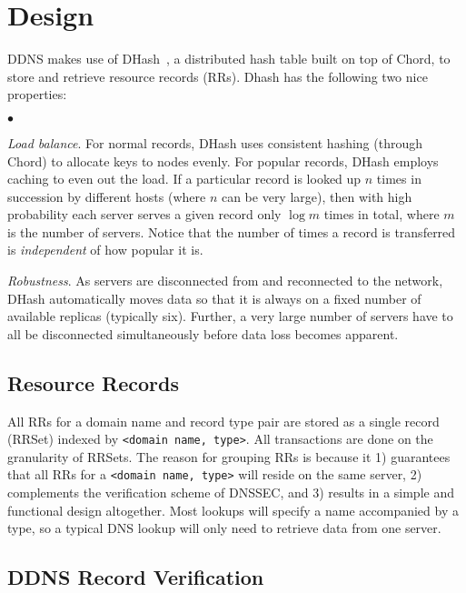 \section{Design}

DDNS makes use of
DHash~\cite{cfs:sosp01}, a distributed hash table
built on top of Chord, to store
and retrieve resource records (RRs).
Dhash has the following two nice properties:

\begin{list}{$\bullet$}{}
\item {\em Load balance}.
For normal records, DHash uses consistent hashing 
(through Chord) to allocate keys to nodes evenly.
For popular records, DHash employs caching to even out
the load. If a particular record is looked up $n$ times
in succession by different hosts (where $n$ can be very large),
then with high probability each server serves a given record 
only $\log{m}$ times in total, 
where $m$ is the number of servers. Notice that
the number of times a record is transferred is 
{\it independent} of how popular it is. 

\item {\em Robustness}.
As servers are disconnected from and reconnected to the network,
DHash automatically moves data so that it is always on a fixed
number of available replicas (typically six).
Further, a very large number of servers have to
all be disconnected simultaneously before data loss
becomes apparent.
\end{list}

\subsection{Resource Records}

All RRs for a domain name and record type pair are stored 
as a single record (RRSet)
indexed by {\tt <domain~name, type>}.
All transactions are done on the granularity
of RRSets. The reason for grouping RRs is because it 1)
guarantees that all RRs for a {\tt <domain~name, type>} will reside on
the same server, 2) complements the verification scheme
of DNSSEC, and 3) results in a simple
and functional design altogether. Most lookups will specify
a name accompanied by a type, so a typical DNS lookup will only need
to retrieve data from one server.

\subsection{DDNS Record Verification}

